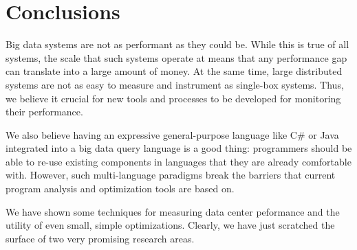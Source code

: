 \section{Conclusions}

Big data systems are not as performant as they could be.
While this is true of all systems, the scale that such systems operate at means that any performance gap can translate into a large amount of money.
At the same time, large distributed systems are not as easy to measure and instrument as single-box systems.
Thus, we believe it crucial for new tools and processes to be developed for monitoring their performance.

We also believe having an expressive general-purpose language like C\# or Java integrated into a big data query language is a good thing: programmers should be able to re-use existing components in languages that they are already comfortable with.
However, such multi-language paradigms break the barriers that current program analysis and optimization tools are based on.

We have shown some techniques for measuring data center peformance and the utility of even small, simple optimizations.
Clearly, we have just scratched the surface of two very promising research areas.
